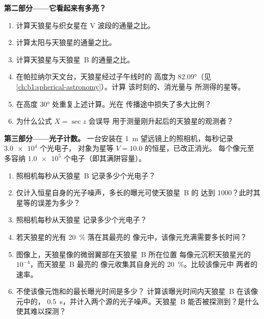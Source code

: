 \begin{problem}
\medskip
\noindent\textbf{第二部分——它看起来有多亮？}
\begin{enumerate}[resume]
  \item 计算天狼星与织女星在 V 波段的通量之比。
  \item 计算太阳与天狼星的通量之比。
  \item 计算天狼星与天狼星~B 的通量之比。
  \item 在帕拉纳尔天文台，天狼星经过子午线时的
        高度为 \ang{82.09}（见\cref{ch:b1:spherical-astronomy}）。计算
        该时刻的、消光量与
        所测得的星等。
  \item 在高度 \ang{30} 处重复上述计算。光在
        传播途中损失了多大比例？
  \item 为什么公式 $X = \sec z$ 会误导
        用于测量刚升起后的天狼星的观测者？
\end{enumerate}

\medskip
\noindent\textbf{第三部分——光子计数。}
一台安装在 \qty{1}{m} 望远镜上的照相机，每秒记录 $\num{3.0e4}$ 个光电子，
对象为星等 $V = 10.0$ 的恒星，已改正消光。
每个像元至多容纳 $\num{1.0e5}$ 个电子（即其满阱容量）。
\begin{enumerate}[resume]
  \item 照相机每秒从天狼星~B
        记录多少个光电子？
  \item 仅计入恒星自身的光子噪声，多长的曝光可使天狼星~B 的
        达到 1000？此时其星等的误差为多少？
  \item 照相机每秒从天狼星
        记录多少个光电子？
  \item 若天狼星的光有 \qty{20}{\percent} 落在其最亮的
        像元中，该像元充满需要多长时间？
  \item 图像上，天狼星像的微弱翼部在天狼星~B 所在位置
        每像元沉积天狼星光的 $10^{-4}$，而天狼星~B 最亮的
        像元收集其自身光的 \qty{20}{\percent}。比较该像元中
        两者的速率。
  \item 不使该像元饱和的最长曝光时间是多少？
        计算该曝光时间内天狼星~B 在该像元中的，
        \qty{0.5}{s}，并计入两个源的光子噪声。天狼星~B
        能否被探测到？是什么使其难以探测？
\end{enumerate}


\end{problem}
